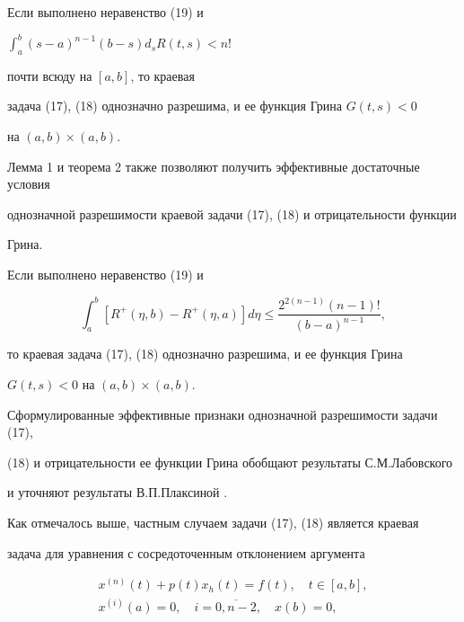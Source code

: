  


\begin{cor} Если выполнено неравенство (19) и 


$\int^b_a(s-a)^{n-1}(b-s)d_sR(t,s)<n!$ 


почти всюду на $[a,b]$, то краевая 


задача (17), (18) однозначно разрешима, и ее функция Грина $G(t,s)<0$ 


на $(a,b)\times(a,b)$. 


\end{cor} 


 


Лемма 1 и теорема 2 также позволяют получить эффективные достаточные условия 


однозначной разрешимости краевой задачи (17), (18) и отрицательности функции 


Грина. 


 


\begin{cor} Если выполнено неравенство (19) и 


$$ 


\int^b_a[R^+(\eta,b)-R^+(\eta,a)]d\eta \le 


\frac{2^{2(n-1)}(n-1)!}{(b-a)^{n-1}}, 


$$ 


то краевая задача (17), (18) однозначно разрешима, и ее функция Грина 


$G(t,s)<0$ на $(a,b)\times(a,b)$. 


\end{cor} 


 


Сформулированные эффективные признаки однозначной разрешимости задачи (17), 


(18) и отрицательности ее функции Грина обобщают результаты С.М.Лабовского 


\cite{Lab} и уточняют результаты В.П.Плаксиной \cite{Pla}. 


 


Как отмечалось выше, частным случаем задачи (17), (18) является краевая 


задача для уравнения с сосредоточенным отклонением аргумента 


\begin{equation} 


\begin{split} 


x^{(n)}(t)+p(t)x_h(t)=f(t),\quad t\in[a,b],\\ 


x^{(i)}(a)=0,\quad i=\overline{0,n-2},\quad x(b)=0, 


\end{split} 


\end{equation} 


